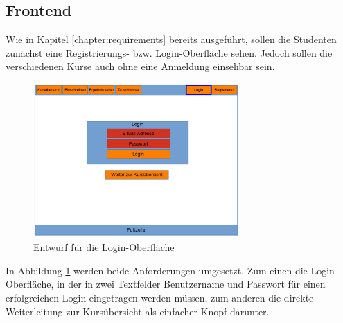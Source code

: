         \subsection{Frontend}
            Wie in Kapitel \ref{chapter:requirements} bereits ausgeführt, sollen die Studenten zunächst eine Registrierungs- bzw. Login-Oberfläche sehen.
            Jedoch sollen die verschiedenen Kurse auch ohne eine Anmeldung einsehbar sein.
            \begin{figure}[t]
            	\centering
            	\includegraphics[width=0.7\textwidth]{./design/MockUpsFrontend/frontendLogin.png}
            	\caption{Entwurf für die Login-Oberfläche}
            	\label{mockupLoginFrontend}
            \end{figure}   
        
            In Abbildung \ref{mockupLoginFrontend} werden beide Anforderungen umgesetzt.
            Zum einen die Login-Oberfläche, in der in zwei Textfelder Benutzername und Passwort für einen erfolgreichen Login eingetragen werden müssen, zum anderen die direkte Weiterleitung zur Kursübersicht als einfacher Knopf darunter.

